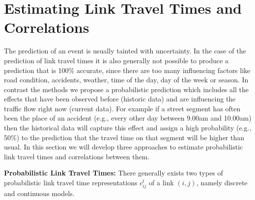 \section{Estimating Link Travel Times and Correlations}
\label{sec:lttestimation} 

The prediction of an event is usually tainted with uncertainty. In the
case of the prediction of link travel times it is also generally not possible to
produce a prediction that is 100\% accurate, since there are too many
influencing factors like road condition, accidents, weather, time of the day,
day of the week or season. In contrast the methods we propose a
probabilistic prediction which includes all the effects that have been observed
before (historic data) and are influencing the traffic flow right now (current
data). For example if a street segment has often been the place of an accident
(e.g., every other day between 9.00am and 10.00am) then the historical data
will capture this effect and assign a high probability (e.g., 50\%) to the
prediction that the travel time on that segment will be higher than usual.
In this section we will develop three approaches to estimate probabilistic link
travel times and correlations between them.


\textbf{Probabilistic Link Travel Times: } There generally
exists two types of probabilistic link travel time representations
$c_{ij}^t$ of a link $(i,j)$, namely discrete and continuous models. 


